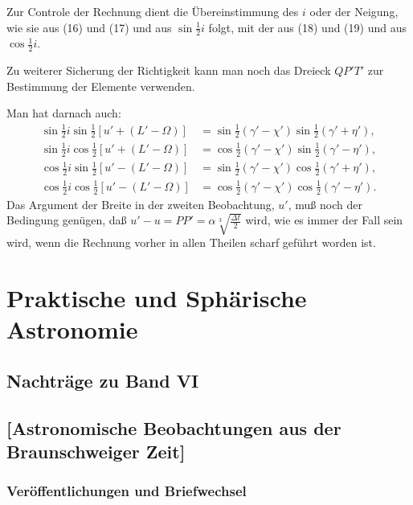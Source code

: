 \documentclass[12pt,a4paper]{article}
\theoremstyle{plain}
\theoremstyle{definition}
\theoremstyle{remark}
\begin{document}
Zur Controle der Rechnung dient die Übereinstimmung des $i$ oder der Neigung, wie sie aus (16) und (17) und aus $\sin\tfrac{1}{2}i$ folgt, mit der aus (18) und (19) und aus $\cos\tfrac{1}{2}i$.

Zu weiterer Sicherung der Richtigkeit kann man noch das Dreieck $QP'T'$ zur Bestimmung der Elemente verwenden.

Man hat darnach auch:
\begin{align}
\sin\tfrac{1}{2}i \sin\tfrac{1}{2}[u' + (L' - \Omega)] &= \sin\tfrac{1}{2}(\gamma' - \chi') \sin\tfrac{1}{2}(\gamma' + \eta'), \tag{20}\\
\sin\tfrac{1}{2}i \cos\tfrac{1}{2}[u' + (L' - \Omega)] &= \cos\tfrac{1}{2}(\gamma' - \chi') \sin\tfrac{1}{2}(\gamma' - \eta'), \tag{21}\\
\cos\tfrac{1}{2}i \sin\tfrac{1}{2}[u' - (L' - \Omega)] &= \sin\tfrac{1}{2}(\gamma' - \chi') \cos\tfrac{1}{2}(\gamma' + \eta'), \tag{22}\\
\cos\tfrac{1}{2}i \cos\tfrac{1}{2}[u' - (L' - \Omega)] &= \cos\tfrac{1}{2}(\gamma' - \chi') \cos\tfrac{1}{2}(\gamma' - \eta'). \tag{23}
\end{align}
Das Argument der Breite in der zweiten Beobachtung, $u'$, muß noch der Bedingung genügen, daß $u' - u = PP' = \alpha\sqrt[3]{\frac{\Delta t}{2}}$ wird, wie es immer der Fall sein wird, wenn die Rechnung vorher in allen Theilen scharf geführt worden ist.

\newpage
\section*{Praktische und Sphärische Astronomie}
\subsection*{Nachträge zu Band VI}

\newpage
\subsection*{[Astronomische Beobachtungen aus der Braunschweiger Zeit]}

\subsubsection*{Veröffentlichungen und Briefwechsel}
\end{document}

